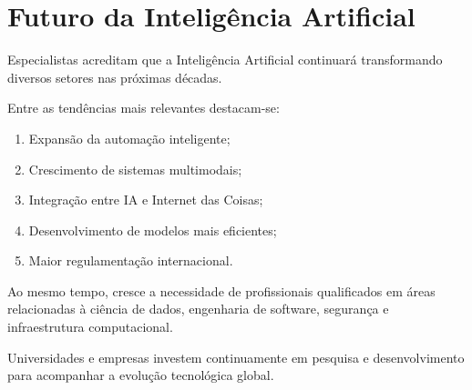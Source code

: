 \section{Futuro da Inteligência Artificial}

Especialistas acreditam que a Inteligência Artificial continuará transformando diversos setores
nas próximas décadas.

Entre as tendências mais relevantes destacam-se:

\begin{enumerate}
    \item Expansão da automação inteligente;
    \item Crescimento de sistemas multimodais;
    \item Integração entre IA e Internet das Coisas;
    \item Desenvolvimento de modelos mais eficientes;
    \item Maior regulamentação internacional.
\end{enumerate}

Ao mesmo tempo, cresce a necessidade de profissionais qualificados em áreas relacionadas à
ciência de dados, engenharia de software, segurança e infraestrutura computacional.

Universidades e empresas investem continuamente em pesquisa e desenvolvimento para
acompanhar a evolução tecnológica global. 